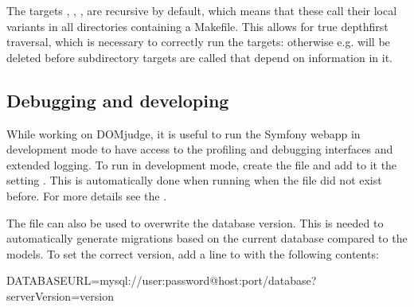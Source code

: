 \documentclass[a4paper,10pt,english,openany]{sphinxmanual}
\begin{document}
\sphinxAtStartPar
The targets , , , 
are recursive by default, which means that these call their local
 variants in all directories containing a Makefile. This
allows for true depth\sphinxhyphen{}first traversal, which is necessary to correctly
run the  targets: otherwise e.g.  will
be deleted before subdirectory  targets are called that
depend on information in it.


\subsection{Debugging and developing}
\label{\detokenize{develop:debugging-and-developing}}
\sphinxAtStartPar
While working on DOMjudge, it is useful to run the Symfony webapp in
development mode to have access to the profiling and debugging
interfaces and extended logging. To run in development mode, create
the file  and add to it the setting
. This is automatically done when running  when the file did not exist before.
For more details see the .

\sphinxAtStartPar
The  file can also be used to overwrite the database
version. This is needed to automatically generate migrations based on the
current database compared to the models. To set the correct version, add a line
to  with the following contents:

\begin{sphinxVerbatim}[commandchars=\\\{\}]
DATABASE\PYGZus{}URL=mysql://\PYGZlt{}user\PYGZgt{}:\PYGZlt{}password\PYGZgt{}@\PYGZlt{}host\PYGZgt{}:\PYGZlt{}port\PYGZgt{}/\PYGZlt{}database\PYGZgt{}?serverVersion=\PYGZlt{}version\PYGZgt{}
\end{sphinxVerbatim}
\end{document}
